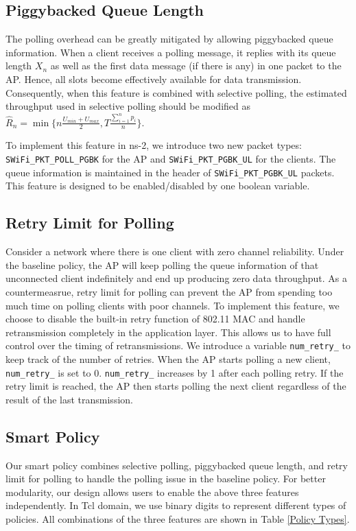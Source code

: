 \documentclass{article}
\begin{document}
\subsection{Piggybacked Queue Length}

The polling overhead can be greatly mitigated by allowing piggybacked queue information. When a client receives a polling message, it replies with its queue length $X_n$ as well as the first data message (if there is any) in one packet to the AP. Hence, all slots become effectively available for data transmission. Consequently, when this feature is combined with selective polling, the estimated throughput used in selective polling should be modified as $\hat{R}_n = \min \{n\frac{U_{min}+U_{max}}{2}, T \frac{\sum_{i=1}^{n}p_i}{n} \}$. 

To implement this feature in ns-2, we introduce two new packet types: \lstinline|SWiFi_PKT_POLL_PGBK| for the AP and \lstinline|SWiFi_PKT_PGBK_UL| for the clients. The queue information is maintained in the header of \lstinline|SWiFi_PKT_PGBK_UL| packets. This feature is designed to be enabled/disabled by one boolean variable.

\subsection{Retry Limit for Polling}

Consider a network where there is one client with zero channel reliability. Under the baseline policy, the AP will keep polling the queue information of that unconnected client indefinitely and end up producing zero data throughput. As a countermeasrue, retry limit for polling can prevent the AP from spending too much time on polling clients with poor channels. 
To implement this feature, we choose to disable the built-in retry function of 802.11 MAC and handle retransmission completely in the application layer. This allows us to have full control over the timing of retransmissions. We introduce a variable \lstinline|num_retry_| to keep track of the number of retries. When the AP starts polling a new client, \lstinline|num_retry_| is set to 0. \lstinline|num_retry_| increases by 1 after each polling retry. If the retry limit is reached, the AP then starts polling the next client regardless of the result of the last transmission. 

\subsection{Smart Policy}
Our smart policy combines selective polling, piggybacked queue length, and retry limit for polling to handle the polling issue in the baseline policy. For better modularity, our design allows users to enable the above three features independently. In Tcl domain, we use binary digits to represent different types of policies. All combinations of the three features are shown in Table \ref{Policy Types}. 
\end{document}
